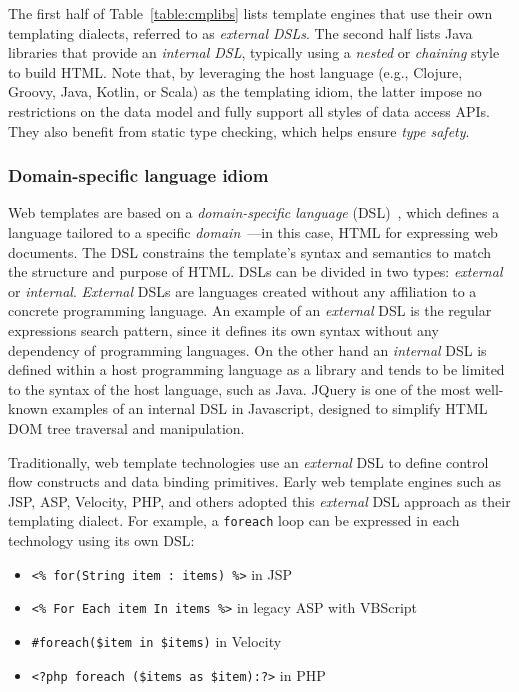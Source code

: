 The first half of Table~\ref{table:cmplibs} lists template engines that use
their own templating dialects, referred to as \textit{external DSLs}. The
second half lists Java libraries that provide an \textit{internal DSL},
typically using a \textit{nested} or \textit{chaining} style to build HTML.
Note that, by leveraging the host language (e.g., Clojure, Groovy, Java,
Kotlin, or Scala) as the templating idiom, the latter impose no restrictions on
the data model and fully support all styles of data access APIs. They also
benefit from static type checking, which helps ensure \textit{type safety}.


\subsubsection{Domain-specific language idiom}

Web templates are based on a \textit{domain-specific language}
(DSL)~\cite{landin1966next}, which defines a language tailored to a specific
\textit{domain}~\cite{evans2004domain}—in this case, HTML for expressing web
documents. The DSL constrains the template's syntax and semantics to match the
structure and purpose of HTML.
DSLs can be divided in two types: \textit{external} or
\textit{internal}\cite{dslbook}. \textit{External} DSLs are languages created
without any affiliation to a concrete programming language. An example of an
\textit{external} DSL is the regular expressions search
pattern\cite{thompson1968}, since it defines its own syntax without any
dependency of programming languages. On the other hand an \textit{internal} DSL
is defined within a host programming language as a library and tends to be
limited to the syntax of the host language, such as Java.
JQuery\cite{resig2007pro} is one of the most well-known examples of an internal
DSL in Javascript, designed to simplify HTML DOM\cite{dom} tree traversal and
manipulation.

Traditionally, web template technologies use an \textit{external} DSL to define
control flow constructs and data binding primitives. Early web template engines
such as JSP, ASP, Velocity, PHP, and others adopted this \textit{external} DSL
approach as their templating dialect. For example, a \texttt{foreach} loop can
be expressed in each technology using its own DSL:
\begin{itemize}
  \item \texttt{<\% for(String item : items) \%>} in JSP
  \item \texttt{<\% For Each item In items \%>} in legacy ASP with VBScript
  \item \texttt{\#foreach(\$item in \$items)} in Velocity
  \item \texttt{<?php foreach (\$items as \$item):?>} in PHP
\end{itemize}

